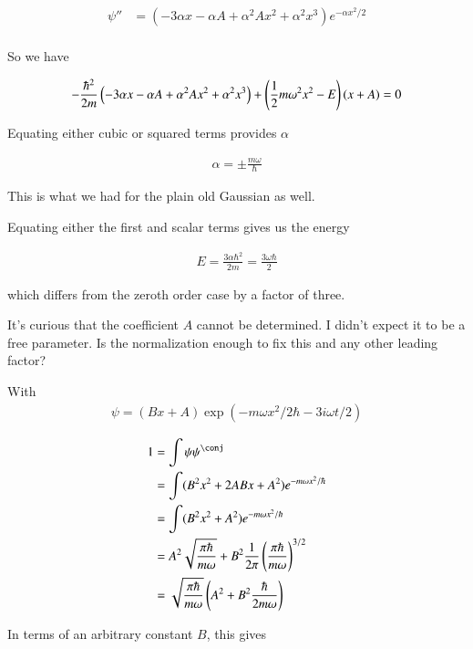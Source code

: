 \documentclass{article}
\begin{document}
\begin{align*}
\psi'' 
&= 
\left( - 3 \alpha x - \alpha A + \alpha^2 A x^2 + \alpha^2 x^3 \right) e^{-\alpha x^2/2} \\
\end{align*}

So we have

\begin{align*}
-\frac{\hbar^2}{2m}\left( - 3 \alpha x - \alpha A + \alpha^2 A x^2 + \alpha^2 x^3 \right) 
+ \left( \frac{1}{2}m \omega^2 x^2 - E \right) (x + A) = 0
\end{align*}

Equating either cubic or squared terms provides $\alpha$

\begin{align*}
\alpha = \pm \frac{m \omega}{\hbar}
\end{align*}

This is what we had for the plain old Gaussian as well.

Equating either the first and scalar terms gives us the energy 

\begin{align*}
E = \frac{3 \alpha \hbar^2}{2m} = \frac{3 \omega \hbar}{2}
\end{align*}

which differs from the zeroth order case by a factor of three.

It's curious that the coefficient $A$ cannot be determined.  I didn't expect it to be a free parameter.  Is the normalization enough to
fix this and any other leading factor?

With
\begin{align*}
\psi = (B x + A) \exp( - m \omega x^2/2 \hbar - 3 i \omega t / 2 )
\end{align*}

\begin{align*}
1 
&= \int \psi\psi^\conj \\
&= \int (B^2 x^2 + 2 A B x + A^2 ) e^{- m \omega x^2/ \hbar } \\
&= \int (B^2 x^2 + A^2 ) e^{- m \omega x^2/ \hbar } \\
&= A^2 \sqrt{\frac{\pi \hbar}{m \omega}} + B^2 \inv{2 \pi} \left( \frac{\pi \hbar}{ m \omega} \right)^{3/2} \\
&= \sqrt{\frac{\pi \hbar}{m \omega}} \left( A^2 + B^2 \frac{ \hbar}{ 2 m \omega} \right) \\
\end{align*}

In terms of an arbitrary constant $B$, this gives
\end{document}
